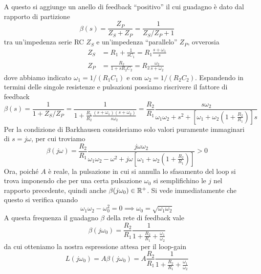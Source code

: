 \documentclass[10pt, a4paper, italian]{article}
\begin{document}
A questo si aggiunge un anello di feedback ``positivo'' il cui guadagno è dato
dal rapporto di partizione
\begin{equation} \label{eq:loop-gain-beta}
\beta(s) = \frac{Z_P}{Z_S + Z_P} = \frac{1}{Z_S/Z_P + 1}
\end{equation}
tra un'impedenza serie RC $Z_S$ e un'impedenza ``parallelo'' $Z_P$, ovverosia
\begin{align*}
Z_S &= R_1 + \frac{1}{s C_1} = R_1 \frac{s + \omega_1}{s} \\
Z_P &= \frac{R_2}{1 + s R_2 C_2} = R_2 \frac{\omega_2}{s + \omega_2}
\end{align*}
dove abbiamo indicato $\omega_1 = 1/(R_1 C_1)$ e con $\omega_2 = 1/(R_2 C_2)$.
Espandendo in termini delle singole resistenze e pulsazioni possiamo riscrivere
il fattore di feedback
\begin{equation}
\beta(s) = \frac{1}{1 + Z_S/Z_P} =
\frac{1}{1 + \frac{R_1}{R_2} \frac{(s + \omega_1)(s + \omega_2)}{s \omega_2}} =
\frac{R_2}{R_1} \frac{s \omega_2}{\omega_1 \omega_2 + s^2 +
\left[\omega_{1} + \omega_{2} \left(1 + \frac{R_2}{R_{1}}\right)\right] s}
\end{equation}
Per la condizione di Barkhausen consideriamo solo valori puramente immaginari
di $s = j\omega$, per cui troviamo
\begin{equation}
\beta(j\omega) = \frac{R_2}{R_1} \frac{j \omega \omega_2}
{\omega_1 \omega_2 - \omega^2 + j \omega
\left[\omega_1 + \omega_2 \left(1 + \frac{R_2}{R_1}\right)\right]} > 0
\end{equation}
Ora, poiché $A$ è reale, la pulsazione in cui si annulla lo sfasamento del loop
si trova imponendo che per una certa pulsazione $\omega_0$ si
semplifichino le $j$ nel rapporto precedente, quindi anche
$\beta(j \omega_0) \in \mathbb R^+$.
Si vede immediatamente che questo si verifica quando
\begin{equation}\label{eq: omega0}
\omega_1 \omega_2 - \omega_0^2 = 0 \implies \omega_0 =
\sqrt{\omega_1 \omega_2}
\end{equation}
A questa frequenza il guadagno $\beta$ della rete di feedback vale
\[
\beta(j\omega_0) =
\frac{R_2}{R_1} \frac{1}{1 + \frac{R_2}{R_1} + \frac{\omega_1}{\omega_2}}
\]
da cui otteniamo la nostra espressione attesa per il loop-gain
\begin{equation}
L(j \omega_0) = A \beta(j \omega_0) =
A \frac{R_2}{R_1} \frac{1}{1 + \frac{R_2}{R_1} + \frac{\omega_1}{\omega_2}}
\end{equation}
\end{document}
